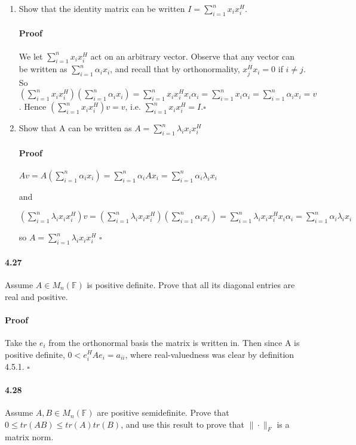 \documentclass[letterpaper,12pt]{article}
\theoremstyle{definition}
\begin{document}
\begin{enumerate}[label=(\roman*)]
\item Show that the identity matrix can be written $I = \sum_{i = 1}^nx_ix_i^H$. 

\paragraph{Proof} We let $\sum_{i = 1}^nx_ix_i^H$ act on an arbitrary vector.
Observe that any vector can be written as $\sum_{i = 1}^n\alpha_i x_i$, and recall that by orthonormality, $x_j^Hx_i = 0$ if $i \neq j$. So $(\sum_{i = 1}^nx_ix_i^H)(\sum_{i = 1}^n\alpha_i x_i) = \sum_{i = 1}^nx_ix_i^Hx_i \alpha_i = \sum_{i = 1}^nx_i \alpha_i = \sum_{i = 1}^n\alpha_i x_i = v$. Hence $(\sum_{i = 1}^nx_ix_i^H)v = v$, i.e. $\sum_{i = 1}^nx_ix_i^H = I$.$\square$


\item Show that A can be written as $A = \sum_{i = 1}^n\lambda_ix_ix_i^H$

\paragraph{Proof} $A v =  A (\sum_{i = 1}^n\alpha_i x_i) = \sum_{i = 1}^n\alpha_i A x_i = \sum_{i = 1}^n\alpha_i \lambda_i x_i$ 

and

$(\sum_{i = 1}^n\lambda_ix_ix_i^H) v = (\sum_{i = 1}^n\lambda_ix_ix_i^H)(\sum_{i = 1}^n\alpha_i x_i) = \sum_{i = 1}^n \lambda_i x_ix_i^Hx_i \alpha_i = \sum_{i = 1}^n \alpha_i \lambda_i x_i $

so $ A = \sum_{i = 1}^n\lambda_ix_ix_i^H$ $\square$

\end{enumerate}


\paragraph{4.27} Assume $A \in M_n(\mathbb{F})$ is positive definite. Prove that all its diagonal entries are real and positive.

\paragraph{Proof} Take the $e_i$ from the orthonormal basis the matrix is written in. Then since A is  positive definite, $0 < e_i^H A e_i = a_{ii}$, where real-valuedness was clear by definition 4.5.1.  $\square$


\paragraph{4.28} Assume $A, B \in M_n(\mathbb{F})$ are positive semidefinite. Prove that $0 \le tr(AB) \le tr(A)tr(B)$, and use this result to prove that $\| \cdot \|_F$ is a matrix norm.
\end{document}
